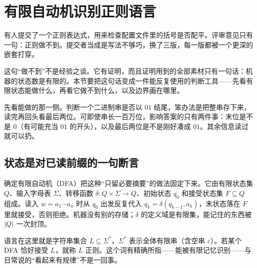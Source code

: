 \section{有限自动机识别正则语言}
\label{sec:04-Discrete-Mathematics/07-Boolean-Algebra-and-Automata/02}

有人提交了一个正则表达式，用来检查配置文件里的括号是否配平。评审意见只有一句：正则做不到。提交者当成是写法不够巧，换了三版，每一版都被一个更深的嵌套打穿。

这句``做不到''不是经验之谈。它有证明，而且证明用到的全部素材只有一句话：机器的状态数是有限的。本节要把这句话变成一件能反复使用的判断工具——先看有限状态能做什么，再看它做不到什么，以及边界画在哪里。

先看能做的那一侧。判断一个二进制串是否以 \(01\) 结尾，笨办法是把整串存下来，读完再回头看最后两位。可即使串长一百万位，影响答案的只有两件事：末位是不是 \(0\)（有可能充当 \(01\) 的开头），以及最后两位是不是刚好凑成 \(01\)。其余信息读过就可以扔。

\subsection{状态是对已读前缀的一句断言}

确定有限自动机（DFA）把这种``只留必要摘要''的做法固定下来。它由有限状态集 \(Q\)、输入字母表 \(\Sigma\)、转移函数 \(\delta:Q\times\Sigma\to Q\)、初始状态 \(q_0\) 和接受状态集 \(F\subseteq Q\) 组成。读入 \(w=a_1\cdots a_n\) 时从 \(q_0\) 出发反复代入 \(q_k=\delta(q_{k-1},a_k)\)，末状态落在 \(F\) 里就接受，否则拒绝。机器没有别的存储；\(\delta\) 的定义域是有限集，能记住的东西被 \(\left|Q\right|\) 一次封顶。

语言在这里就是字符串集合 \(L\subseteq\Sigma^*\)，\(\Sigma^*\) 表示全体有限串（含空串 \(\varepsilon\)）。若某个 DFA 恰好接受 \(L\)，就称 \(L\) 正则。这个词有精确所指——能被有限记忆识别——与日常说的``看起来有规律''不是一回事。

